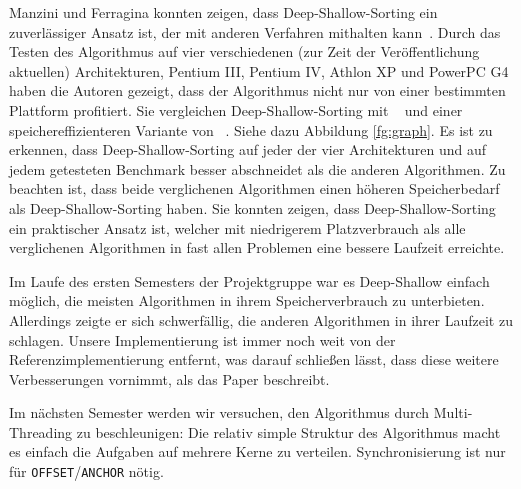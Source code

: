 Manzini und Ferragina konnten zeigen, dass Deep-Shallow-Sorting ein zuverlässiger Ansatz ist, der mit anderen Verfahren mithalten kann~\cite{saca:4}.
Durch das Testen des Algorithmus auf vier verschiedenen (zur Zeit der Veröffentlichung aktuellen) Architekturen, Pentium III, Pentium IV, Athlon XP und PowerPC G4 haben die Autoren gezeigt, dass der Algorithmus nicht nur von einer bestimmten Plattform profitiert.
Sie vergleichen Deep-Shallow-Sorting mit \qsufsort~\cite{saca:1} und einer speichereffizienteren Variante von \cache~\cite{seward2000}. Siehe dazu Abbildung \ref{fg:graph}.
Es ist zu erkennen, dass Deep-Shallow-Sorting auf jeder der vier Architekturen und auf jedem getesteten Benchmark besser abschneidet als die anderen Algorithmen.
Zu beachten ist, dass beide verglichenen Algorithmen einen höheren Speicherbedarf als Deep-Shallow-Sorting haben.
Sie konnten zeigen, dass Deep-Shallow-Sorting ein praktischer Ansatz ist, welcher mit niedrigerem Platzverbrauch als alle verglichenen Algorithmen in fast allen Problemen eine bessere Laufzeit erreichte.

Im Laufe des ersten Semesters der Projektgruppe war es Deep-Shallow einfach möglich, die meisten Algorithmen in ihrem Speicherverbrauch zu unterbieten.
Allerdings zeigte er sich schwerfällig, die anderen Algorithmen in ihrer Laufzeit zu schlagen.
Unsere Implementierung ist immer noch weit von der Referenzimplementierung entfernt, was darauf schließen lässt, dass diese weitere Verbesserungen vornimmt, als das Paper beschreibt.

Im nächsten Semester werden wir versuchen, den Algorithmus durch Multi-Threading zu beschleunigen:
Die relativ simple Struktur des Algorithmus macht es einfach die Aufgaben auf mehrere Kerne zu verteilen.
Synchronisierung ist nur für \texttt{OFFSET}/\texttt{ANCHOR} nötig.
